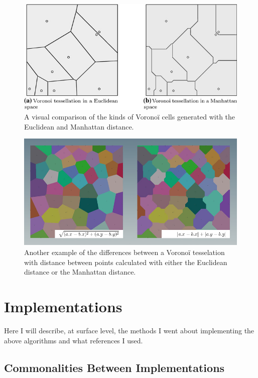 \begin{figure}[H]
    \centering
    \includegraphics{Images/Voronoitessellations.jpg}
    \caption{A visual comparison of the kinds of Voronoï cells generated with the Euclidean and Manhattan distance.\cite{reffortesselations}}
    \label{fig:voronoicomparison}
\end{figure}

\begin{figure}[H]
    \centering
    \includegraphics[width=\textwidth]{Images/manhattan_example_02.jpg}
    \caption{Another example of the differences between a Voronoï tesselation with distance between points calculated with either the Euclidean distance or the Manhattan distance.\cite{manvoronoi}}
    \label{fig:secondvoronoicomparison}
\end{figure}

\section{Implementations}

Here I will describe, at surface level, the methods I went about implementing the above algorithms and what references I used.

\subsection{Commonalities Between Implementations} \label{commonalities}

